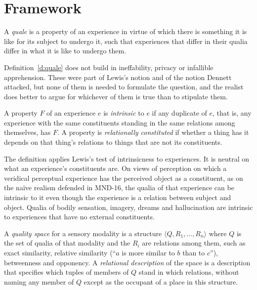 \documentclass{situationist-preprint}
\begin{document}
\section{Framework}

\begin{definition}[Quale]\label{d:quale}
A \emph{quale} is a property of an experience in virtue of which there is something it is like for its subject to undergo it, such that experiences that differ in their qualia differ in what it is like to undergo them.
\end{definition}

Definition~\ref{d:quale} does not build in ineffability, privacy or infallible apprehension. These were part of Lewis's notion and of the notion Dennett attacked, but none of them is needed to formulate the question, and the realist does better to argue for whichever of them is true than to stipulate them.

\begin{definition}[Intrinsic]\label{d:intrinsic}
A property $F$ of an experience $e$ is \emph{intrinsic} to $e$ if any duplicate of $e$, that is, any experience with the same constituents standing in the same relations among themselves, has $F$. A property is \emph{relationally constituted} if whether a thing has it depends on that thing's relations to things that are not its constituents.
\end{definition}

The definition applies Lewis's test of intrinsicness to experiences. It is neutral on what an experience's constituents are. On views of perception on which a veridical perceptual experience has the perceived object as a constituent, as on the naïve realism defended in MND-16, the qualia of that experience can be intrinsic to it even though the experience is a relation between subject and object. Qualia of bodily sensation, imagery, dreams and hallucination are intrinsic to experiences that have no external constituents.

\begin{definition}\label{d:space}
A \emph{quality space} for a sensory modality is a structure $\langle Q, R_1, \ldots, R_n\rangle$ where $Q$ is the set of qualia of that modality and the $R_i$ are relations among them, such as exact similarity, relative similarity (\enquote{$a$ is more similar to $b$ than to $c$}), betweenness and opponency. A \emph{relational description} of the space is a description that specifies which tuples of members of $Q$ stand in which relations, without naming any member of $Q$ except as the occupant of a place in this structure.
\end{definition}
\end{document}
